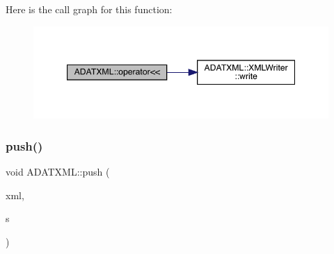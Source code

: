 Here is the call graph for this function\+:\nopagebreak
\begin{figure}[H]
\begin{center}
\leavevmode
\includegraphics[width=347pt]{d7/da0/namespaceADATXML_a83bf96b9b273ac7b48f1f7eef49b5390_cgraph}
\end{center}
\end{figure}
\mbox{\label{namespaceADATXML_a1e8531ea0cb1a302d918f3b427969425}} 
\subsubsection{\texorpdfstring{push()}{push()}}
{\footnotesize\ttfamily void A\+D\+A\+T\+X\+M\+L\+::push (\begin{DoxyParamCaption}\item[{\mbox{\hyperlink{classADATXML_1_1XMLWriter}{X\+M\+L\+Writer}} \&}]{xml,  }\item[{const string \&}]{s }\end{DoxyParamCaption})}

